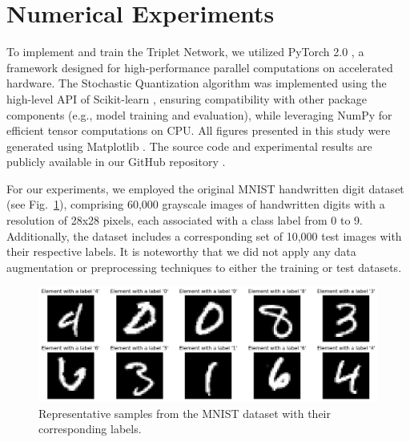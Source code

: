 \section{Numerical Experiments}

To implement and train the Triplet Network, we utilized PyTorch 2.0 \cite{Ansel_2024}, a framework designed for high-performance parallel computations on accelerated hardware. The Stochastic Quantization algorithm was implemented using the high-level API of Scikit-learn \cite{Pedregosa_2011}, ensuring compatibility with other package components (e.g., model training and evaluation), while leveraging NumPy \cite{harris2020array} for efficient tensor computations on CPU. All figures presented in this study were generated using Matplotlib \cite{Hunter_2007}. The source code and experimental results are publicly available in our GitHub repository \cite{Kozyriev_2024}.

For our experiments, we employed the original MNIST handwritten digit dataset \cite{lecun2010mnist} (see Fig.~\ref{mnist:fig}), comprising 60,000 grayscale images of handwritten digits with a resolution of 28x28 pixels, each associated with a class label from 0 to 9. Additionally, the dataset includes a corresponding set of 10,000 test images with their respective labels. It is noteworthy that we did not apply any data augmentation or preprocessing techniques to either the training or test datasets.
\begin{figure}
    \centering
    \includegraphics[width=\textwidth]{figures/dataset.png}
    \caption{Representative samples from the MNIST dataset \cite{lecun2010mnist} with their corresponding labels.}
    \label{mnist:fig}
\end{figure}

